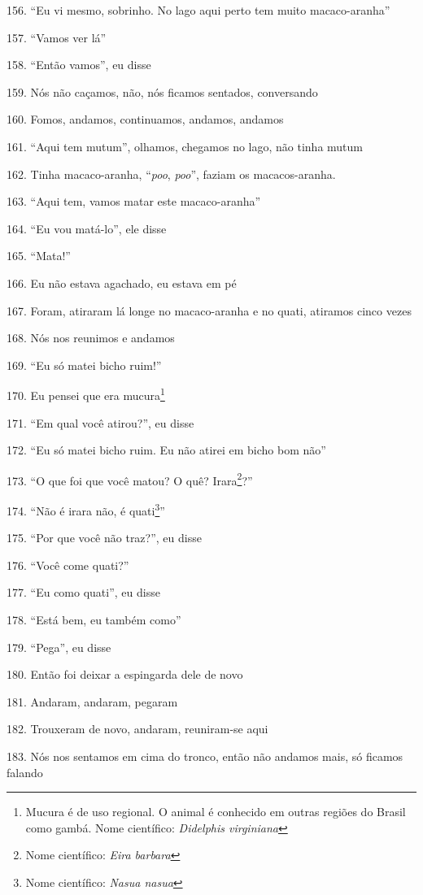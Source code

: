 156. ``Eu vi mesmo, sobrinho. No lago aqui perto tem muito macaco-aranha''

157. ``Vamos ver lá''

158. ``Então vamos'', eu disse

159. Nós não caçamos, não, nós ficamos sentados, conversando

160. Fomos, andamos, continuamos, andamos, andamos

161. ``Aqui tem mutum'', olhamos, chegamos no lago, não tinha mutum

162. Tinha macaco-aranha, ``\emph{poo}, \emph{poo}'', faziam os
macacos-aranha. 

163. ``Aqui tem, vamos matar este macaco-aranha''

164. ``Eu vou matá-lo'', ele disse

165. ``Mata!''

166. Eu não estava agachado, eu estava em pé

167. Foram, atiraram lá longe no macaco-aranha e no quati, atiramos cinco
vezes

168. Nós nos reunimos e andamos

169. ``Eu só matei bicho ruim!''

170. Eu pensei que era mucura\footnote{Mucura é de uso regional. O animal
  é conhecido em outras regiões do Brasil como gambá. Nome científico:
  \emph{Didelphis virginiana}}

171. ``Em qual você atirou?'', eu disse

172. ``Eu só matei bicho ruim. Eu não atirei em bicho bom não''

173. ``O que foi que você matou? O quê? Irara\footnote{Nome científico:
  \emph{Eira barbara}}?''

174. ``Não é irara não, é quati\footnote{Nome científico: \emph{Nasua
  nasua}}''

175. ``Por que você não traz?'', eu disse

176. ``Você come quati?''

177. ``Eu como quati'', eu disse

178. ``Está bem, eu também como''

179. ``Pega'', eu disse

180. Então foi deixar a espingarda dele de novo

181. Andaram, andaram, pegaram

182. Trouxeram de novo, andaram, reuniram-se aqui

183. Nós nos sentamos em cima do tronco, então não andamos mais, só
ficamos falando

